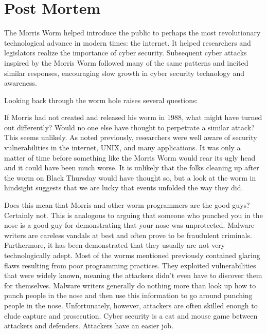 \section*{Post Mortem}

The Morris Worm helped introduce the public to
perhaps the most revolutionary technological advance in modern times: the
internet. It helped researchers and legislators realize the importance of cyber
security. Subsequent cyber attacks inspired by the Morris Worm followed many of
the same patterns and incited similar responses, encouraging slow growth in
cyber security technology and awareness.

Looking back through the worm hole raises several questions: 

If Morris had not created and released his worm in 1988, what might have turned
out differently? Would no one else have thought to perpetrate a similar attack?
This seems unlikely. As noted previously, researchers were well aware of
security vulnerabilities in the internet, UNIX, and many applications. It was
only a matter of time before something like the Morris Worm would rear its ugly
head and it could have been much worse. It is unlikely that the folks cleaning
up after the worm on Black Thursday would have thought so, but a look at the
worm in hindsight suggests that we are lucky that events unfolded the way they did.

Does this mean that Morris and other worm programmers are the good guys?
Certainly not. This is analogous to arguing that someone who punched you in the
nose is a good guy for demonstrating that your nose was unprotected. Malware
writers are careless vandals at best and often prove to be fraudulent criminals.
Furthermore, it has been demonstrated that they usually are not very 
technologically adept. Most of the worms mentioned previously contained glaring
flaws resulting from poor programming practices. They exploited vulnerabilities
that were widely known, meaning the attackers didn't even have to discover them
for themselves. Malware writers generally do nothing more than look up how to
punch people in the nose and then use this information to go around punching
people in the nose.
Unfortunately, however, attackers are often skilled enough to elude capture and
prosecution.
Cyber security is a cat and mouse game between attackers and defenders.
Attackers have an easier job.

